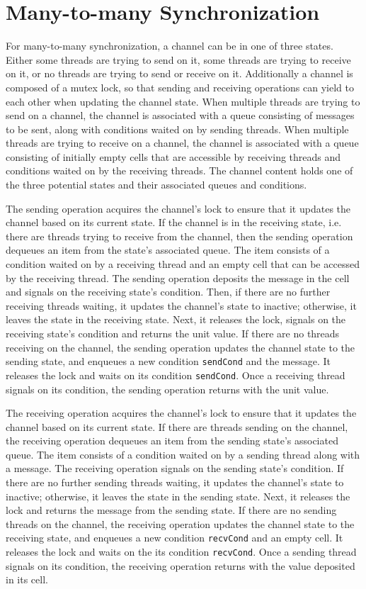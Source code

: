\documentclass[letterpaper, 11pt]{report}
\begin{document}
\section{Many-to-many Synchronization}
For many-to-many synchronization, a channel can be in one of three states.
Either some threads are trying to send on it,
some threads are trying to receive on it, or no threads are trying to send or receive on it.
Additionally a channel is composed of a mutex lock,
so that sending and receiving operations can yield
to each other when updating the channel state. When multiple threads are trying to send on a
channel, the channel is associated with a queue consisting of messages to be sent, along with
conditions waited on by sending threads. When multiple threads are trying to receive on a
channel, the channel is associated with a queue consisting of
initially empty cells that are accessible by receiving threads and
conditions waited on by the receiving threads.
The channel content holds one of the three potential states and their
associated queues and conditions.

The sending operation acquires the channel's lock to
ensure that it updates the channel based on
its current state. If the channel is in the receiving state,
i.e. there are threads trying to receive from the channel,
then the sending operation dequeues an item from the state's associated queue.
The item consists of a condition waited on by a receiving thread and an empty cell
that can be accessed by the receiving thread.
The sending operation deposits the message in the cell and signals on the receiving state's condition.
Then, if there are no further receiving threads waiting, it updates the channel's state to inactive; otherwise,
it leaves the state in the receiving state.
Next, it releases the lock, signals on the receiving state's condition and returns the unit value.
If there are no threads receiving on the
channel, the sending operation updates the channel state to the sending state,
and enqueues a new condition \lstinline{sendCond} and the message.
It releases the lock and waits on its condition \lstinline{sendCond}.
Once a receiving thread signals on its condition, the sending operation returns with the unit value.

The receiving operation acquires the channel's lock
to ensure that it updates the channel based on
its current state. If there are threads
sending on the channel, the receiving 
operation dequeues an item from the sending state's associated queue. The item consists of a condition
waited on by a sending thread along with a message.
The receiving operation signals on the sending state's condition.
If there are no further sending threads waiting, it updates the channel's state to inactive; otherwise,
it leaves the state in the sending state.
Next, it releases the lock and returns the message from the sending state.
If there are no sending threads on the
channel, the receiving operation updates the channel state to the receiving state, and enqueues
a new condition \lstinline{recvCond} and an empty cell. It releases the lock and waits on
the its condition \lstinline{recvCond}. Once a sending thread signals on its condition,
the receiving operation returns with the value deposited in its cell.
\end{document}
